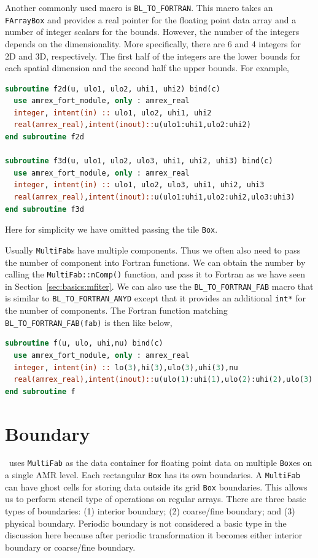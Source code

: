 {{Another commonly used macro is {\tt BL\_TO\_FORTRAN}.  This macro
takes an {\tt FArrayBox} and provides a real pointer for the floating
point data array and a number of integer scalars for the bounds.
However, the number of the integers depends on the dimensionality.
More specifically, there are 6 and 4 integers for 2D and 3D,
respectively.  The first half of the integers are the lower bounds for
each spatial dimension and the second half the upper bounds.  For
example,
\begin{lstlisting}[language=fortran]
subroutine f2d(u, ulo1, ulo2, uhi1, uhi2) bind(c)
  use amrex_fort_module, only : amrex_real
  integer, intent(in) :: ulo1, ulo2, uhi1, uhi2
  real(amrex_real),intent(inout)::u(ulo1:uhi1,ulo2:uhi2)
end subroutine f2d

subroutine f3d(u, ulo1, ulo2, ulo3, uhi1, uhi2, uhi3) bind(c)
  use amrex_fort_module, only : amrex_real
  integer, intent(in) :: ulo1, ulo2, ulo3, uhi1, uhi2, uhi3
  real(amrex_real),intent(inout)::u(ulo1:uhi1,ulo2:uhi2,ulo3:uhi3)
end subroutine f3d
\end{lstlisting}
Here for simplicity we have omitted passing the tile {\tt Box}.

Usually {\tt MultiFab}s have multiple components.  Thus we often also
need to pass the number of component into Fortran functions.  We can
obtain the number by calling the {\tt MultiFab::nComp()} function, and
pass it to Fortran as we have seen in Section~\ref{sec:basics:mfiter}.
We can also use the {\tt BL\_TO\_FORTRAN\_FAB} macro that is similar
to {\tt BL\_TO\_FORTRAN\_ANYD} except that it provides an additional
{\tt int*} for the number of components.  The Fortran function
matching {\tt BL\_TO\_FORTRAN\_FAB(fab)} is then like below,
\begin{lstlisting}[language=fortran]
subroutine f(u, ulo, uhi,nu) bind(c)
  use amrex_fort_module, only : amrex_real
  integer, intent(in) :: lo(3),hi(3),ulo(3),uhi(3),nu
  real(amrex_real),intent(inout)::u(ulo(1):uhi(1),ulo(2):uhi(2),ulo(3):uhi(3),nu)
end subroutine f
\end{lstlisting}

\section{Boundary}

\amrex\ uses {\tt MultiFab} as the data container for floating point
data on multiple {\tt Box}es on a single AMR level.  Each rectangular
{\tt Box} has its own boundaries.  A {\tt MultiFab} can have ghost cells for
storing data outside its grid {\tt Box} boundaries.  This allows us to
perform stencil type of operations on regular arrays.  There are three
basic types of boundaries: (1) interior boundary; (2) coarse/fine
boundary; and (3) physical boundary.  Periodic boundary is not
considered a basic type in the discussion here because after periodic
transformation it becomes either interior boundary or coarse/fine
boundary. 

}}
